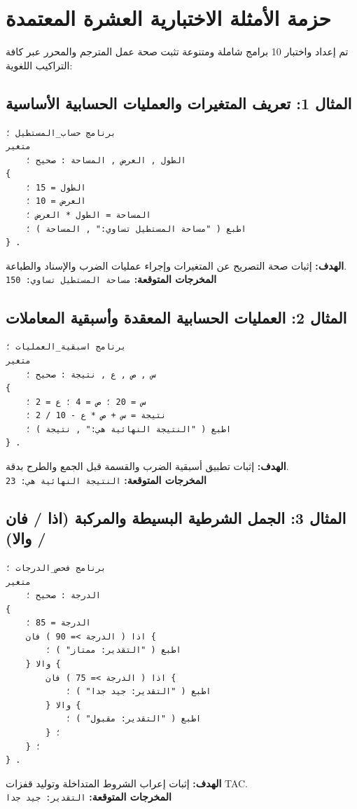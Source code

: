 \documentclass[11pt,a4paper,oneside]{report}
\begin{document}
\chapter{حزمة الأمثلة الاختبارية العشرة المعتمدة}

تم إعداد واختبار 10 برامج شاملة ومتنوعة تثبت صحة عمل المترجم والمحرر عبر كافة التراكيب اللغوية:

\section{المثال 1: تعريف المتغيرات والعمليات الحسابية الأساسية}
\begin{tcolorbox}[colback=BgLight,colframe=BorderGray]
\begin{lstlisting}
برنامج حساب_المستطيل ؛
متغير
    الطول , العرض , المساحة : صحيح ؛
{
    الطول = 15 ؛
    العرض = 10 ؛
    المساحة = الطول * العرض ؛
    اطبع ( "مساحة المستطيل تساوي:" , المساحة ) ؛
} .
\end{lstlisting}
\end{tcolorbox}
\textbf{الهدف:} إثبات صحة التصريح عن المتغيرات وإجراء عمليات الضرب والإسناد والطباعة.\\
\textbf{المخرجات المتوقعة:} \texttt{مساحة المستطيل تساوي: 150}

\section{المثال 2: العمليات الحسابية المعقدة وأسبقية المعاملات}
\begin{tcolorbox}[colback=BgLight,colframe=BorderGray]
\begin{lstlisting}
برنامج اسبقية_العمليات ؛
متغير
    س , ص , ع , نتيجة : صحيح ؛
{
    س = 20 ؛ ص = 4 ؛ ع = 2 ؛
    نتيجة = س + ص * ع - 10 / 2 ؛
    اطبع ( "النتيجة النهائية هي:" , نتيجة ) ؛
} .
\end{lstlisting}
\end{tcolorbox}
\textbf{الهدف:} إثبات تطبيق أسبقية الضرب والقسمة قبل الجمع والطرح بدقة.\\
\textbf{المخرجات المتوقعة:} \texttt{النتيجة النهائية هي: 23}

\section{المثال 3: الجمل الشرطية البسيطة والمركبة (اذا / فان / والا)}
\begin{tcolorbox}[colback=BgLight,colframe=BorderGray]
\begin{lstlisting}
برنامج فحص_الدرجات ؛
متغير
    الدرجة : صحيح ؛
{
    الدرجة = 85 ؛
    اذا ( الدرجة >= 90 ) فان {
        اطبع ( "التقدير: ممتاز" ) ؛
    } والا {
        اذا ( الدرجة >= 75 ) فان {
            اطبع ( "التقدير: جيد جدا" ) ؛
        } والا {
            اطبع ( "التقدير: مقبول" ) ؛
        } ؛
    } ؛
} .
\end{lstlisting}
\end{tcolorbox}
\textbf{الهدف:} إثبات إعراب الشروط المتداخلة وتوليد قفزات TAC.\\
\textbf{المخرجات المتوقعة:} \texttt{التقدير: جيد جدا}
\end{document}
